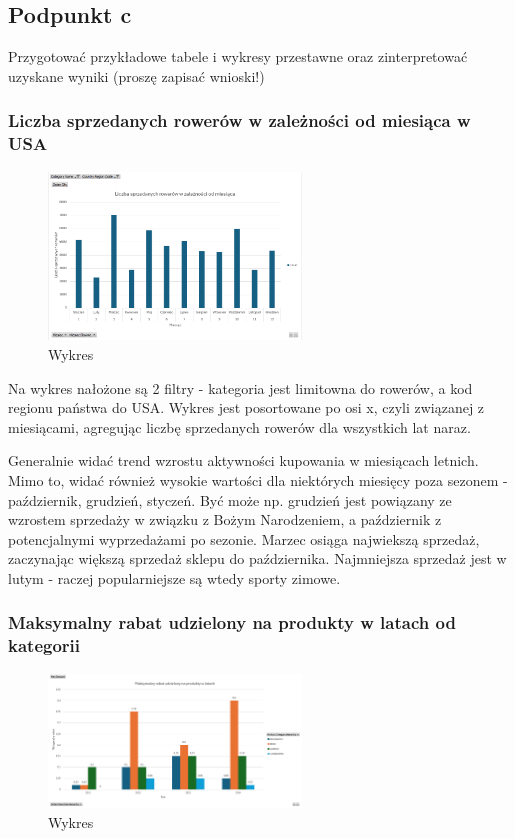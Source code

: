 \documentclass[a4paper,12pt]{article}
\begin{document}
\subsection{Podpunkt c}

Przygotować przykładowe tabele i wykresy przestawne oraz zinterpretować uzyskane
wyniki (proszę zapisać wnioski!)

\subsubsection{Liczba sprzedanych rowerów w zależności od miesiąca w USA}

\begin{figure}[H]
  \centering
  \includegraphics[width=0.6\textwidth]{bike_sales.png}
  \caption{Wykres}
\end{figure}

Na wykres nałożone są 2 filtry - kategoria jest limitowna do rowerów, a kod regionu państwa do USA. Wykres jest posortowane po osi x, czyli związanej z miesiącami, agregując liczbę sprzedanych rowerów dla wszystkich lat naraz.

Generalnie widać trend wzrostu aktywności kupowania w miesiącach letnich. Mimo to, widać również wysokie wartości dla niektórych miesięcy poza sezonem - październik, grudzień, styczeń. Być może np. grudzień jest powiązany ze wzrostem sprzedaży w związku z Bożym Narodzeniem, a październik z potencjalnymi wyprzedażami po sezonie. Marzec osiąga najwiekszą sprzedaż, zaczynając większą sprzedaż sklepu do października. Najmniejsza sprzedaż jest w lutym - raczej popularniejsze są wtedy sporty zimowe.

\subsubsection{Maksymalny rabat udzielony na produkty w latach od kategorii}

\begin{figure}[H]
  \centering
  \includegraphics[width=0.6\textwidth]{max_discount.png}
  \caption{Wykres}
\end{figure}
\end{document}
